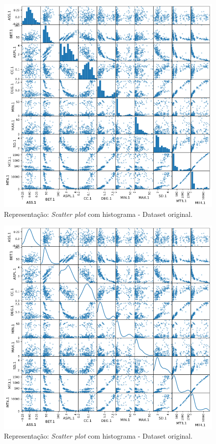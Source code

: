 \documentclass[
	article,			%
	11pt,				%
	oneside,			%
	a4paper,			%
	english,			%
	brazil,				%
	sumario=tradicional
	]{abntex2}
\begin{document}
\newpage
\begin{figure}[h!]
 \centering
 \includegraphics[scale=0.5]{fig/scatter_hist01.png}
 \caption{Representação: \textit{Scatter plot} com histograma - Dataset original.}
 \label{fig:scatter_hist01}
\end{figure}

\newpage
\begin{figure}[h!]
 \centering
 \includegraphics[scale=0.5]{fig/scatter_kde01.png}
 \caption{Representação: \textit{Scatter plot} com histograma - Dataset original.}
 \label{fig:scatter_kde01}
\end{figure}
\end{document}
